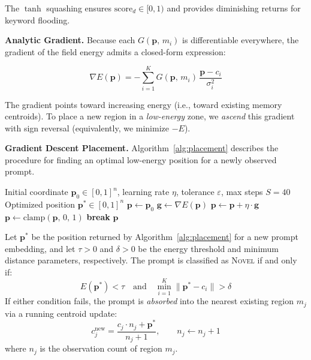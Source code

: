 \documentclass[sigconf,natbib=false]{acmart}
\begin{document}
The $\tanh$ squashing ensures $\text{score}_d \in [0,1)$ and provides
diminishing returns for keyword flooding.

\textbf{Analytic Gradient.}
Because each $G(\mathbf{p},\, m_i)$ is differentiable everywhere, the
gradient of the field energy admits a closed-form expression:

\begin{equation}
\label{eq:field-gradient}
\nabla E(\mathbf{p}) = -\sum_{i=1}^{K}
  G(\mathbf{p},\, m_i)\,
  \frac{\mathbf{p} - c_i}{\sigma_i^2}
\end{equation}

The gradient points toward increasing energy (i.e., toward existing memory
centroids). To place a new region in a \emph{low-energy} zone, we
\emph{ascend} this gradient with sign reversal (equivalently, we minimize
$-E$).

\textbf{Gradient Descent Placement.}
Algorithm~\ref{alg:placement} describes the procedure for finding an
optimal low-energy position for a newly observed prompt.

\begin{algorithm}[t]
\caption{GradientDescentPlacement($\mathbf{p}_0$, FieldND $\mathcal{F}$)}
\label{alg:placement}
\begin{algorithmic}[1]
\Require Initial coordinate $\mathbf{p}_0 \in [0,1]^n$, learning rate $\eta$, tolerance $\varepsilon$, max steps $S = 40$
\Ensure Optimized position $\mathbf{p}^* \in [0,1]^n$
\State $\mathbf{p} \gets \mathbf{p}_0$
  \State $\mathbf{g} \gets \nabla E(\mathbf{p})$
  \State $\mathbf{p} \gets \mathbf{p} + \eta \cdot \mathbf{g}$
  \State $\mathbf{p} \gets \text{clamp}(\mathbf{p},\, 0,\, 1)$
    \State \textbf{break}
  \EndIf
\EndFor
\Return $\mathbf{p}$
\end{algorithmic}
\end{algorithm}

\begin{theorem}
\label{thm:novelty}
Let $\mathbf{p}^*$ be the position returned by
Algorithm~\ref{alg:placement} for a new prompt embedding, and let
$\tau > 0$ and $\delta > 0$ be the energy threshold and minimum distance
parameters, respectively. The prompt is classified as \textsc{Novel} if and
only if:
\begin{equation}
\label{eq:novelty}
E(\mathbf{p}^*) < \tau
\quad \text{and} \quad
\min_{i=1}^{K} \|\mathbf{p}^* - c_i\| > \delta
\end{equation}
If either condition fails, the prompt is \emph{absorbed} into the nearest
existing region $m_j$ via a running centroid update:
\begin{equation}
\label{eq:absorption}
c_j^{\text{new}} = \frac{c_j \cdot n_j + \mathbf{p}^*}{n_j + 1},
\qquad
n_j \gets n_j + 1
\end{equation}
where $n_j$ is the observation count of region $m_j$.
\end{theorem}
\end{document}
